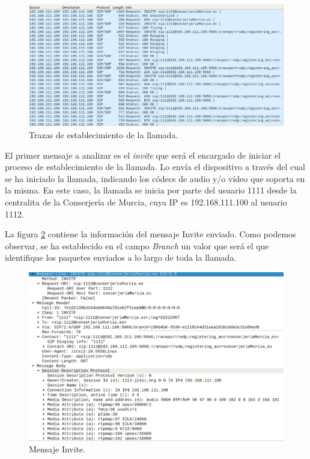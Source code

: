 \documentclass[a4paper]{article}
\begin{document}
\newpage
\begin{figure}[htb]
    \begin{center}
    
        \includegraphics[width=1\textwidth]{esquema-general.png}
         \caption{Trazas de establecimiento de la llamada.}
         \label{fig:establecimiento}
    \end{center}
\end{figure}

  El primer mensaje a analizar es el \textit{invite} que será el encargado de iniciar el proceso de establecimiento de la llamada. Lo envía el dispositivo a través del cual se ha iniciado la llamada, indicando los códecs de audio y/o vídeo que soporta en la misma. En este caso, la llamada se inicia por parte del usuario 1111 desde la centralita de la Conserjería de Murcia, cuya IP es 192.168.111.100 al usuario 1112.

 
 La figura \ref{fig:invite1} contiene la información del mensaje Invite enviado. Como podemos observar, se ha establecido en el campo \textit{Branch} un valor que será el que identifique los paquetes enviados a lo largo de toda la llamada.
\begin{figure}[htb]
    \begin{center}
    
        \includegraphics[width=1\textwidth]{invite1.png}
        \caption{Mensaje Invite.}
         \label{fig:invite1}
    \end{center}
\end{figure}
\end{document}
